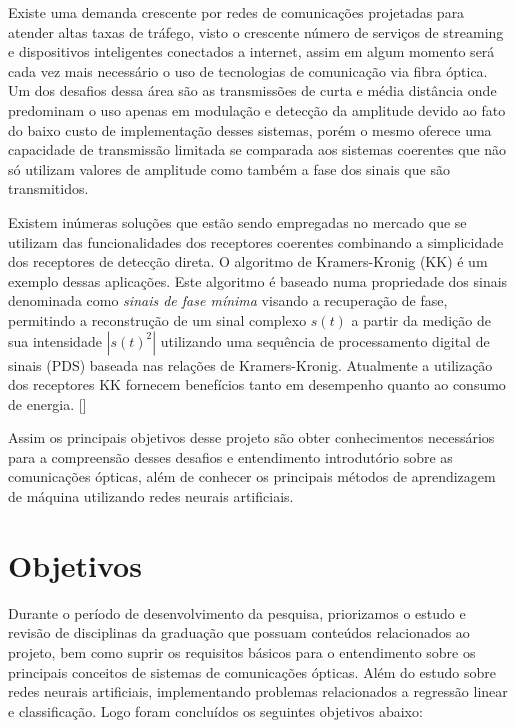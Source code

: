 \documentclass[12pt,openright,openany,oneside,article,a4paper,brazi]{abntex2}
\begin{document}
Existe uma demanda crescente por redes de comunicações projetadas para atender altas taxas de tráfego,
visto o crescente número de serviços de streaming e dispositivos inteligentes conectados a internet, assim
em algum momento será cada vez mais necessário o uso de tecnologias de comunicação via fibra óptica. Um dos desafios 
dessa área são as transmissões de curta e média distância onde predominam o uso apenas em modulação e detecção da amplitude devido 
ao fato do baixo custo de implementação desses sistemas, porém o mesmo oferece uma capacidade de transmissão 
limitada se comparada aos sistemas coerentes que não só utilizam valores de amplitude como também a fase dos 
sinais que são transmitidos.

Existem inúmeras soluções que estão sendo empregadas no mercado que se utilizam das funcionalidades dos
receptores coerentes combinando a simplicidade dos receptores de detecção direta. O algoritmo de Kramers-Kronig (KK) é 
um exemplo dessas aplicações. Este algoritmo é baseado numa propriedade dos sinais denominada como \textit{sinais de fase mínima}
visando a recuperação de fase, permitindo a reconstrução de um sinal complexo $s(t)$ a partir da medição de sua intensidade 
$\displaystyle\left\lvert s(t)^2 \right\rvert $ utilizando uma sequência de processamento digital de sinais (PDS) baseada nas relações de Kramers-Kronig. 
Atualmente a utilização dos receptores KK fornecem benefícios tanto em desempenho quanto ao consumo de energia. []  

Assim os principais objetivos desse projeto são obter conhecimentos necessários para a compreensão desses desafios e entendimento introdutório sobre as comunicações ópticas, 
além de conhecer os principais métodos de aprendizagem de máquina utilizando redes neurais artificiais.

\section*{Objetivos}

Durante o período de desenvolvimento da pesquisa, priorizamos o estudo e revisão de disciplinas da graduação que possuam conteúdos relacionados
ao projeto, bem como suprir os requisitos básicos para o entendimento sobre os principais conceitos de sistemas de comunicações ópticas. 
Além do estudo sobre redes neurais artificiais, implementando problemas relacionados a regressão linear e classificação. Logo foram concluídos os seguintes objetivos abaixo: 
\end{document}
